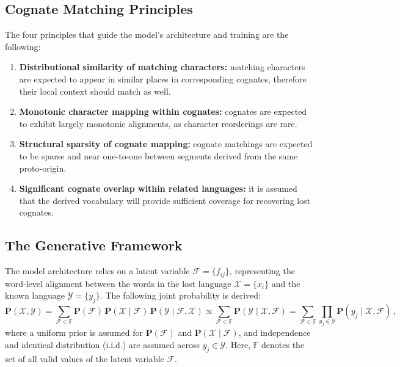 \subsection{Cognate Matching Principles}
The four principles that guide the model's architecture and training are the following:
\begin{enumerate}[leftmargin=2em, label=\textbf{\arabic*.}]
    \item \textbf{Distributional similarity of matching characters:}
    matching characters are expected to appear in similar places in corresponding cognates, therefore their local context should match as well.

    \item \textbf{Monotonic character mapping within cognates:}
    cognates are expected to exhibit largely monotonic alignments, as character reorderings are rare.

    \item \textbf{Structural sparsity of cognate mapping:}
    cognate matchings are expected to be sparse and near one-to-one between segments derived from the same proto-origin.

    \item \textbf{Significant cognate overlap within related languages:}
    it is assumed that the derived vocabulary will provide sufficient coverage for recovering lost cognates.
\end{enumerate}

\subsection{The Generative Framework}
The model architecture relies on a latent variable $\mathcal{F}=\{f_{ij}\}$, representing the word-level alignment between the words in the lost language $\mathcal{X}=\{x_i\}$ and the known language $\mathcal{Y}=\{y_j\}$.
The following joint probability is derived:
\[
\mathbf{P}(\mathcal{X}, \mathcal{Y})
= \sum_{\mathcal{F}\in \mathbb{F}}
  \mathbf{P}(\mathcal{F})\,\mathbf{P}(\mathcal{X}\mid \mathcal{F})\,\mathbf{P}(\mathcal{Y}\mid \mathcal{F}, \mathcal{X})
\propto
\sum_{\mathcal{F}\in \mathbb{F}}
  \mathbf{P}(\mathcal{Y}\mid \mathcal{X}, \mathcal{F})
=
\sum_{\mathcal{F}\in \mathbb{F}}
  \prod_{y_j\in \mathcal{Y}}
  \mathbf{P}(y_j \mid \mathcal{X}, \mathcal{F}) \, ,
\]
where a uniform prior is assumed for $\mathbf{P}(\mathcal{F})$ and $\mathbf{P}(\mathcal{X}\mid \mathcal{F})$, and independence and identical distribution (i.i.d.) are assumed across $y_j\in\mathcal{Y}$.
Here, $\mathbb{F}$ denotes the set of all valid values of the latent variable $\mathcal{F}$.

